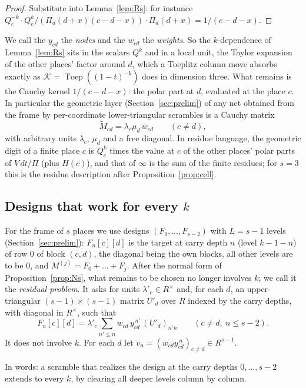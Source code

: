 \documentclass[11pt]{amsart}
\theoremstyle{definition}
\theoremstyle{plain}
\begin{document}
\begin{proof}
Substitute into Lemma~\ref{lem:Rs}: for instance $Q_c^{-k}\cdot Q_c^k/(\Pi_d(d+x)(c-d-x))\cdot\Pi_d(d+x)=1/(c-d-x)$.
\end{proof}

We call the $y_{cd}$ the \emph{nodes} and the $w_{cd}$ the \emph{weights}. So the $k$-dependence of Lemma~\ref{lem:Rs} sits in the scalars $Q^k$ and in a local unit, the Taylor expansion of the other places' factor around $d$, which a Toeplitz column move absorbs exactly as $\mathcal K=\operatorname{Toep}((1-t)^{-k})$ does in dimension three. What remains is the Cauchy kernel $1/(c-d-x)$: the polar part at $d$, evaluated at the place $c$. In particular the geometric layer (Section~\ref{sec:prelim}) of any net obtained from the frame by per-coordinate lower-triangular scrambles is a Cauchy matrix
\[
\tilde M_{cd}=\lambda_c\mu_d\,w_{cd}\qquad(c\ne d),
\]
with arbitrary units $\lambda_c$, $\mu_d$ and a free diagonal. In residue language, the geometric digit of a finite place $c$ is $Q_c^k$ times the value at $c$ of the other places' polar parts of $V\,dt/\Pi$ (plus $H(c)$), and that of $\infty$ is the sum of the finite residues; for $s=3$ this is the residue description after Proposition~\ref{prop:cell}.

\subsection{Designs that work for every \texorpdfstring{$k$}{k}}
For the frame of $s$ places we use designs $(F_0,\dots,F_{s-2})$ with $L=s-1$ levels (Section~\ref{sec:prelim}): $F_n[c][d]$ is the target at carry depth $n$ (level $k-1-n$) of row $0$ of block $(c,d)$, the diagonal being the own blocks, all other levels are to be $0$, and $M^{(j)}=F_0+\dots+F_j$. After the normal form of Proposition~\ref{prop:Ns}, what remains to be chosen no longer involves $k$; we call it the \emph{residual problem}. It asks for units $\lambda'_c\in R^\times$ and, for each $d$, an upper-triangular $(s-1)\times(s-1)$ matrix $U'_d$ over $R$ indexed by the carry depths, with diagonal in $R^\times$, such that
\[
F_n[c][d]=\lambda'_c\sum_{n'\le n}w_{cd}\,y_{cd}^{\,n'}\,(U'_d)_{n'n}\qquad(c\ne d,\ n\le s-2).
\]
It does not involve $k$. For each $d$ let $v_n=(w_{cd}y_{cd}^{\,n})_{c\ne d}\in R^{s-1}$.

In words: a scramble that realizes the design at the carry depths $0,\dots,s-2$ extends to every $k$, by clearing all deeper levels column by column.
\end{document}
